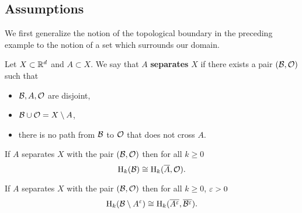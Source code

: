 
\subsection{Assumptions}\label{ssec:assumptions}

We first generalize the notion of the topological boundary in the preceding example to the notion of a set which surrounds our domain.

Let $X\subset \mathbb{R}^d$ and $A\subset X$.
We say that $A$ \textbf{separates} $X$ if there exists a pair $({\mathcal{B}}, \mathcal{O})$ such that
\begin{itemize}
    \item ${\mathcal{B}}, A, \mathcal{O}$ are disjoint,
    \item ${\mathcal{B}} \cup \mathcal{O} = X\setminus A$,
    \item there is no path from ${\mathcal{B}}$ to $\mathcal{O}$ that does not cross $A$.
\end{itemize}

\begin{lemma}
    If $A$ separates $X$ with the pair $({\mathcal{B}}, \mathcal{O})$ then for all $k\geq 0$
    \[ \mathrm{H}_k({\mathcal{B}})\cong\mathrm{H}_k(\overline{A}, \mathcal{O}). \]
\end{lemma}
%
%

\begin{lemma}\label{lem:surrounds}
    If $A$ separates $X$ with the pair $({\mathcal{B}}, \mathcal{O})$ then for all $k\geq 0$, $\varepsilon > 0$
    \[\mathrm{H}_k({\mathcal{B}}\setminus A^\varepsilon)\cong \mathrm{H}_k(\overline{A^\varepsilon}, \overline{{\mathcal{B}}^\varepsilon}).\]
\end{lemma}

